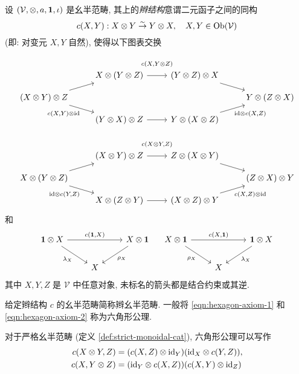 \begin{definition}\label{def:braiding}
	设 $(\mathcal{V}, \otimes, a, \mathbf{1}, \iota)$ 是幺半范畴, 其上的\emph{辫结构}意谓二元函子之间的同构
	\[ c(X,Y): X \otimes Y \stackrel{\sim}{\rightarrow} Y \otimes X, \quad X, Y \in \operatorname{Ob}(\mathcal{V}) \]
	(即: 对变元 $X, Y$ 自然), 使得以下图表交换
	\begin{equation}\label{eqn:hexagon-axiom-1}\begin{tikzcd}[row sep=small]
		{} & X \otimes (Y \otimes Z) \arrow[r, "{c(X, Y \otimes Z)}" inner sep=1em] & (Y \otimes Z) \otimes X \arrow[rd] & \\
		(X \otimes Y) \otimes Z \arrow[ru] \arrow[rd, "{c(X,Y) \otimes \identity}"'] & & & Y \otimes (Z \otimes X) \\
		& (Y \otimes X) \otimes Z \arrow[r] & Y \otimes (X \otimes Z) \arrow[ru, "{\identity \otimes c(X,Z)}"'] &
	\end{tikzcd}\end{equation}
	\begin{equation}\label{eqn:hexagon-axiom-2}\begin{tikzcd}[row sep=small]
		{} & (X \otimes Y) \otimes Z \arrow[r, "{c(X \otimes Y, Z)}" inner sep=1em] & Z \otimes (X \otimes Y) \arrow[rd] & \\
		X \otimes (Y \otimes Z) \arrow[ru] \arrow[rd, "{\identity \otimes c(Y, Z)}"'] & & & (Z \otimes X) \otimes Y \\
		& X \otimes (Z \otimes Y) \arrow[r] & (X \otimes Z) \otimes Y \arrow[ru, "{c(X, Z) \otimes \identity}"'] &
	\end{tikzcd}\end{equation}
	和
	\begin{equation}\begin{tikzcd}
		\munit \otimes X \arrow[rd, "\lambda_X"'] \arrow[rr, "{c(\munit, X)}"] & & X \otimes \munit \arrow[ld, "\rho_X"] \\
		& X &
	\end{tikzcd} \quad \begin{tikzcd}
		X \otimes \munit \arrow[rd, "\rho_X"'] \arrow[rr, "{c(X, \munit)}"] & & \munit  \otimes X \arrow[ld, "\lambda_X"] \\
		& X &
	\end{tikzcd}\end{equation}
	其中 $X,Y,Z$ 是 $\mathcal{V}$ 中任意对象, 未标名的箭头都是结合约束或其逆.
\end{definition}

给定辫结构 $c$ 的幺半范畴简称辫幺半范畴. 一般将 \eqref{eqn:hexagon-axiom-1} 和 \eqref{eqn:hexagon-axiom-2} 称为六角形公理.
\begin{remark}\label{rem:hexagon-axiom-strict}
	对于严格幺半范畴 (定义 \ref{def:strict-monoidal-cat}), 六角形公理可以写作
	\begin{align*}
		c(X \otimes Y, Z) & = (c(X, Z) \otimes \mathrm{id}_Y) (\mathrm{id}_X \otimes c(Y, Z)), \\
		c(X, Y \otimes Z) & = (\mathrm{id}_Y \otimes c(X, Z)) (c(X, Y) \otimes \mathrm{id}_Z)
	\end{align*}
\end{remark}

